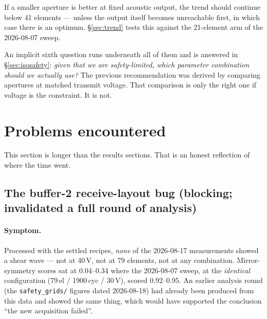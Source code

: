 \documentclass[11pt,a4paper]{article}
\begin{document}
\begin{description}[leftmargin=1.4em,style=nextline]
  \item[H5 (added 2026-08-20).] If a smaller aperture is better at fixed acoustic output, the trend
  should continue below 41 elements --- unless the output itself becomes unreachable first, in which
  case there is an optimum. \S\ref{sec:trend} tests this against the 21-element arm of the
  2026-08-07 sweep.
\end{description}

An implicit sixth question runs underneath all of them and is answered in \S\ref{sec:isosafety}:
\emph{given that we are safety-limited, which parameter combination should we actually use?} The
previous recommendation was derived by comparing apertures at matched transmit voltage. That comparison
is only the right one if voltage is the constraint. It is not.

\section{Problems encountered}\label{sec:problems}
This section is longer than the results sections. That is an honest reflection of where the time went.

\subsection{The buffer-2 receive-layout bug (blocking; invalidated a full round of analysis)}
\label{sec:bug}
\paragraph{Symptom.} Processed with the settled recipes, \emph{none} of the 2026-08-17 measurements
showed a shear wave --- not at 40\,V, not at 79 elements, not at any combination. Mirror-symmetry
scores sat at 0.04--0.34 where the 2026-08-07 sweep, at the \emph{identical} configuration
(79\,el / 1900\,cyc / 30\,V), scored 0.92--0.95. An earlier analysis round (the
\texttt{safety\_grids/} figures dated 2026-08-18) had already been produced from this data and showed
the same thing, which would have supported the conclusion ``the new acquisition failed''.
\end{document}
